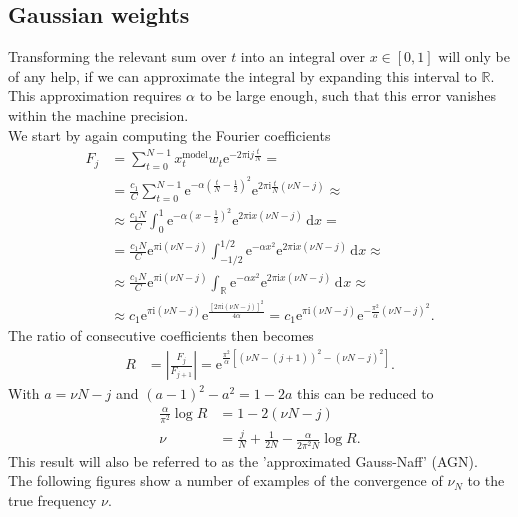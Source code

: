 \documentclass[english, parskip=full]{scrartcl}
\newcommand{\intx}{}
\newcommand{\intr}{}
\newcommand{\kla}{}
\newcommand{\klam}{}
\newcommand{\tecxt}{}
\newcommand{\I}{\text{i}}
\newcommand{\e}{\text{e}}
\begin{document}
\subsection{Gaussian weights}
Transforming the relevant sum over $t$ into an integral over $x\in[0,1]$ will only be of any help, if we can approximate the integral by expanding this interval to $\mathbb{R}$.
This approximation requires $\alpha$ to be large enough, such that this error vanishes within the machine precision. 
\\
We start by again computing the Fourier coefficients
\begin{align}
F_j&=\sum_{t=0}^{N-1}x_t^\tecxt\text{model}w_t\e^{-2\pi\I j\frac{t}{N}}=\\
&=\frac{c_1}{C}\sum_{t=0}^{N-1}\e^{-\alpha\kla\left( {\frac{t}{N}-\frac{1}{2}} \right)^2}\e^{2\pi\I \frac{t}{N}\kla\left( {\nu N - j} \right)}\approx\\
&\approx\frac{c_1N}{C}\intx\int_{0}^{1}\e^{-\alpha\kla\left( {x-\frac{1}{2}} \right)^2}\e^{2\pi\I x\kla\left( {\nu N - j} \right)}\,\mathrm{d}x=\\
&=\frac{c_1N}{C}\e^{\pi\I (\nu N-j)}\intx\int_{-1/2}^{1/2}\e^{-\alpha x^2}\e^{2\pi\I x\kla\left( {\nu N - j} \right)}\,\mathrm{d}x\approx\\
&\approx\frac{c_1N}{C}\e^{\pi\I (\nu N-j)}\intr\int_{\mathbb{R}^{ }}\e^{-\alpha x^2}\e^{2\pi\I x\kla\left( {\nu N - j} \right)}\,\mathrm{d}^{ }x\approx\\
&\approx c_1\e^{\pi\I (\nu N-j)}\e^{\frac{\left[2\pi\I(\nu N-j)\right]^2}{4\alpha}}=c_1\e^{\pi\I (\nu N-j)}\e^{-\frac{\pi^2}{\alpha}(\nu N-j)^2}. \label{eqn:Fj-gauss}
\end{align}
The ratio of consecutive coefficients then becomes
\begin{align}
R&=\left\vert\frac{F_j}{F_{j+1}}\right\vert=\e^{\frac{\pi^2}{\alpha}\klam\left[ {(\nu N-(j+1))^2-(\nu N-j)^2} \right]}.
\end{align}
With $a=\nu N-j$ and $(a-1)^2-a^2=1-2a$ this can be reduced to
\begin{align}
\frac{\alpha}{\pi^2}\log R&=1-2(\nu N-j)\\
\nu&=\frac{j}{N}+\frac{1}{2N}-\frac{\alpha}{2\pi^2N}\log R. \label{eqn:ApproxGaussNaff}
\end{align}
This result will also be referred to as the 'approximated Gauss-Naff' (AGN).
\\
The following figures show a number of examples of the convergence of $\nu_N$ to the true frequency $\nu$.
\end{document}

